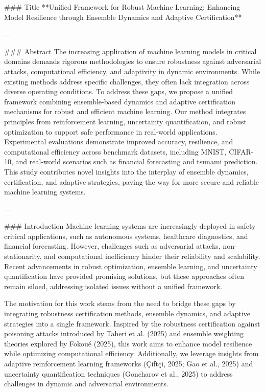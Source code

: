 ### Title
**Unified Framework for Robust Machine Learning: Enhancing Model Resilience through Ensemble Dynamics and Adaptive Certification**

---

### Abstract
The increasing application of machine learning models in critical domains demands rigorous methodologies to ensure robustness against adversarial attacks, computational efficiency, and adaptivity in dynamic environments. While existing methods address specific challenges, they often lack integration across diverse operating conditions. To address these gaps, we propose a unified framework combining ensemble-based dynamics and adaptive certification mechanisms for robust and efficient machine learning. Our method integrates principles from reinforcement learning, uncertainty quantification, and robust optimization to support safe performance in real-world applications. Experimental evaluations demonstrate improved accuracy, resilience, and computational efficiency across benchmark datasets, including MNIST, CIFAR-10, and real-world scenarios such as financial forecasting and tsunami prediction. This study contributes novel insights into the interplay of ensemble dynamics, certification, and adaptive strategies, paving the way for more secure and reliable machine learning systems.

---

### Introduction
Machine learning systems are increasingly deployed in safety-critical applications, such as autonomous systems, healthcare diagnostics, and financial forecasting. However, challenges such as adversarial attacks, non-stationarity, and computational inefficiency hinder their reliability and scalability. Recent advancements in robust optimization, ensemble learning, and uncertainty quantification have provided promising solutions, but these approaches often remain siloed, addressing isolated issues without a unified framework.

The motivation for this work stems from the need to bridge these gaps by integrating robustness certification methods, ensemble dynamics, and adaptive strategies into a single framework. Inspired by the robustness certification against poisoning attacks introduced by Taheri et al. (2025) and ensemble weighting theories explored by Fokoué (2025), this work aims to enhance model resilience while optimizing computational efficiency. Additionally, we leverage insights from adaptive reinforcement learning frameworks (Çiftçi, 2025; Gao et al., 2025) and uncertainty quantification techniques (Goncharov et al., 2025) to address challenges in dynamic and adversarial environments.

